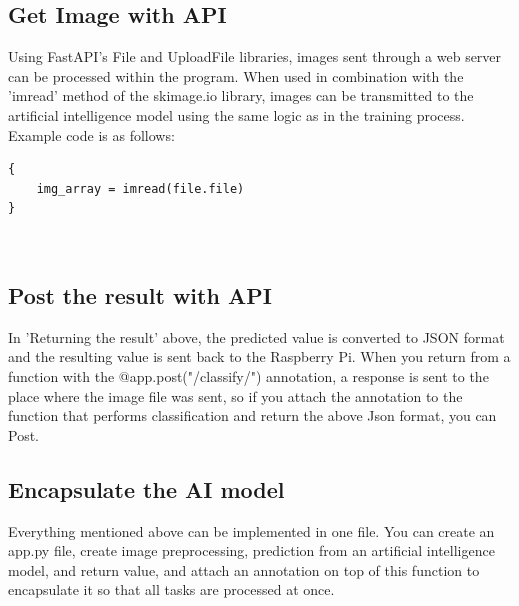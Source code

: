 \subsection{\textbf{Get Image with API}}
Using FastAPI's File and UploadFile libraries, images sent through a web server can be processed within the program. When used in combination with the 'imread' method of the skimage.io library, images can be transmitted to the artificial intelligence model using the same logic as in the training process. Example code is as follows:
\begin{verbatim}
{
    img_array = imread(file.file)
}
\end{verbatim}
\\
\subsection{\textbf{Post the result with API}}
In 'Returning the result' above, the predicted value is converted to JSON format and the resulting value is sent back to the Raspberry Pi. When you return from a function with the @app.post("/classify/") annotation, a response is sent to the place where the image file was sent, so if you attach the annotation to the function that performs classification and return the above Json format, you can Post.\\

\subsection{\textbf{Encapsulate the AI model}}
Everything mentioned above can be implemented in one file. You can create an app.py file, create image preprocessing, prediction from an artificial intelligence model, and return value, and attach an annotation on top of this function to encapsulate it so that all tasks are processed at once.\\

